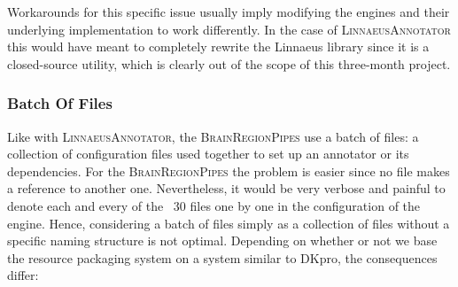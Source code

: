 \documentclass{article}
\newcommand{\ID}[1]{{\textsc{#1}}}
\begin{document}
Workarounds for this specific issue usually imply modifying the engines and their underlying
implementation to work differently. In the case of \ID{Linnaeus\-Annotator} this would have meant to
completely rewrite the Linnaeus library since it is a closed-source utility, which is clearly out of
the scope of this three-month project.

\subsubsection{Batch Of Files}

Like with \ID{LinnaeusAnnotator}, the \ID{BrainRegionPipes} use a batch of files: a collection of
configuration files used together to set up an annotator or its dependencies. For the
\ID{BrainRegionPipes} the problem is easier since no file makes a reference to another one.
Nevertheless, it would be very verbose and painful to denote each and every of the ~30 files one by
one in the configuration of the engine. Hence, considering a batch of files simply as a collection
of files without a specific naming structure is not optimal. Depending on whether or not we base the
resource packaging system on a system similar to DKpro, the consequences differ:
\end{document}
